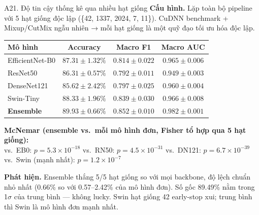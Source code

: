\documentclass[10pt, aspectratio=169]{beamer}
\begin{document}
\begin{frame}{A21. Độ tin cậy thống kê qua nhiều hạt giống}
    \scriptsize
    \textbf{Cấu hình.} Lặp toàn bộ pipeline với 5 hạt giống độc lập (\{42, 1337, 2024, 7, 11\}).
    CuDNN benchmark + Mixup/CutMix ngẫu nhiên → mỗi hạt giống là một quỹ đạo
    tối ưu hóa độc lập.

    \vspace{0.15cm}
    \begin{table}[h]
    \centering
    \begin{tabular}{lccc}
    \toprule
    \textbf{Mô hình} & \textbf{Accuracy} & \textbf{Macro F1} & \textbf{Macro AUC}\\
    \midrule
    EfficientNet-B0 & $87.31 \pm 1.32\%$ & $0.814 \pm 0.022$ & $0.965 \pm 0.006$\\
    ResNet50        & $86.31 \pm 0.57\%$ & $0.792 \pm 0.011$ & $0.949 \pm 0.003$\\
    DenseNet121     & $85.62 \pm 2.42\%$ & $0.797 \pm 0.025$ & $0.960 \pm 0.004$\\
    Swin-Tiny       & $\mathbf{88.33 \pm 1.96\%}$ & $0.839 \pm 0.030$ & $0.966 \pm 0.008$\\
    \midrule
    \rowcolor{usthlight}\textbf{Ensemble} & $\mathbf{89.93 \pm 0.66\%}$ & $\mathbf{0.852 \pm 0.010}$ & $\mathbf{0.982 \pm 0.001}$\\
    \bottomrule
    \end{tabular}
    \end{table}

    \vspace{0.15cm}
    \textbf{McNemar (ensemble vs.\ mỗi mô hình đơn, Fisher tổ hợp qua 5 hạt giống):}\\[2pt]
    vs.\ EB0: $p = 5.3{\times}10^{-18}$ \quad
    vs.\ RN50: $p = 4.5{\times}10^{-31}$ \quad
    vs.\ DN121: $p = 6.7{\times}10^{-39}$ \quad
    vs.\ Swin (mạnh nhất): $p = 1.2{\times}10^{-7}$

    \vspace{0.1cm}
    \textbf{Phát hiện.} Ensemble thắng 5/5 hạt giống so với mọi backbone, độ
    lệch chuẩn nhỏ nhất (0.66\% so với 0.57--2.42\% của mô hình đơn). Số gốc
    89.49\% nằm trong 1$\sigma$ của trung bình --- không lucky. Swin hạt giống 42
    early-stop xui; trung bình thì Swin là mô hình đơn mạnh nhất.
\end{frame}
\end{document}

